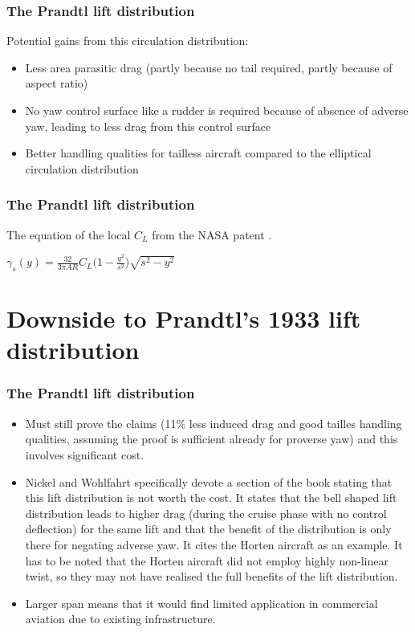 \documentclass{beamer}
\begin{document}
\begin{frame}
    \frametitle{The Prandtl lift distribution}

    Potential gains from this circulation distribution:

    \begin{itemize}
    \item Less area parasitic drag (partly because no tail required, partly because of aspect ratio) 
    \item No yaw control surface like a rudder is required because of absence of adverse yaw, leading to less drag from this control surface
    \item Better handling qualities for tailless aircraft compared to the elliptical circulation distribution
    \end{itemize} 
        
    
\end{frame}


\begin{frame}
    \frametitle{The Prandtl lift distribution}
        
    The equation of the local $C_L$ from the NASA patent \cite{PrandtlPatent}.
    
    \begin{center}
    $\gamma_s(y) = \frac{32}{3 \pi AR} C_L \bigg( 1 - \frac{y^2}{s^2} \bigg) \sqrt{s^2 - y^2}$
    \end{center}

    \end{frame}


\section{Downside to Prandtl's 1933 lift distribution}

\begin{frame}
\frametitle{The Prandtl lift distribution}
\begin{itemize}
\item Must still prove the claims (11\% less induced drag and good tailles handling qualities, assuming the proof is sufficient already for proverse yaw) and this involves significant cost.
\item Nickel and Wohlfahrt \cite{NickelWohlfahrt} specifically devote a section of the book stating that this lift distribution is not worth the cost.  It states that the bell shaped lift distribution leads to higher drag (during the cruise phase with no control deflection) for the same lift and that the benefit of the distribution is only there for negating adverse yaw.  It cites the Horten aircraft as an example.  It has to be noted that the Horten aircraft did not employ highly non-linear twist, so they may not have realised the full benefits of the lift distribution.
\item Larger span means that it would find limited application in commercial aviation due to existing infrastructure.
\end{itemize}
\end{frame}
\end{document}
